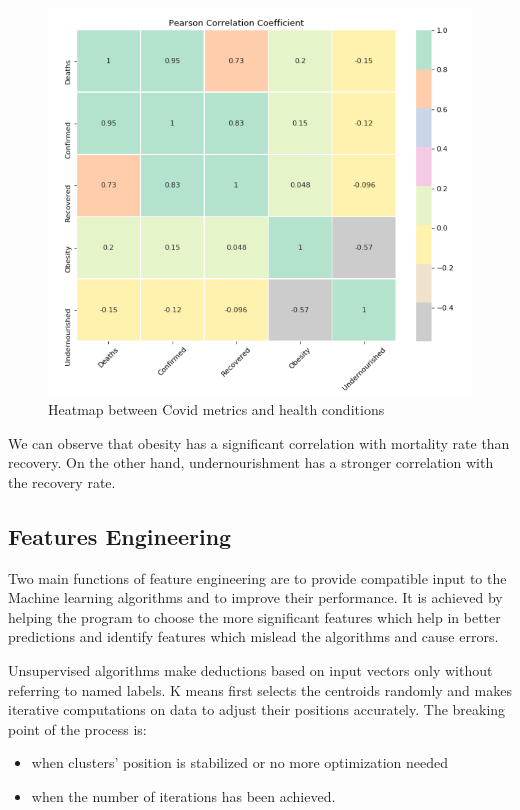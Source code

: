 \documentclass[journal,twoside,web]{ieeecolor}
\begin{document}
\begin{figure}[!t]
\centerline{\includegraphics[width=\columnwidth]{profig4.png}}
\caption{Heatmap between Covid metrics and health conditions}
\label{fig1}
\end{figure}

We can observe that obesity has a significant correlation with mortality rate than recovery. On the other hand, undernourishment has a stronger correlation with the recovery rate.
\subsection{Features Engineering}
Two main functions of feature engineering \cite{drabas2017learning} are to provide compatible input to the Machine learning algorithms and to improve their performance. It is achieved by helping the program to choose the more significant features which help in better predictions and identify features which mislead the algorithms and cause errors.

Unsupervised algorithms \cite{celebi2016unsupervised} make deductions based on input vectors only without referring to named labels. K means first selects the centroids \cite{likas2003global} randomly and makes iterative computations on data to adjust their positions accurately. The breaking point of the process is:
\begin{itemize}
    \item when clusters' position is stabilized or no more optimization needed
    \item when the number of iterations has been achieved.
\end{itemize}
\end{document}
